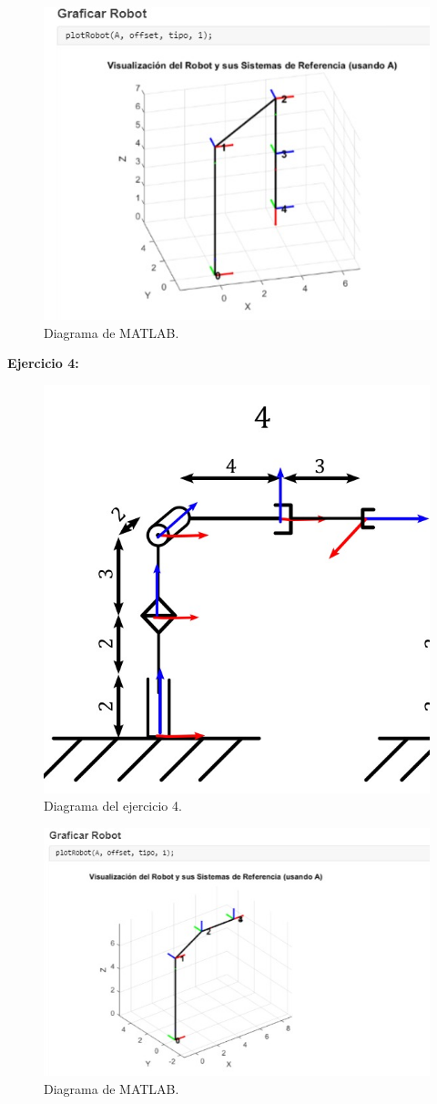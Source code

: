 \begin{figure}[htbp]
	\centering
	\includegraphics[width=0.5\linewidth]{img/EJ3}
	\caption{Diagrama de MATLAB.}
	\label{fig:ej3}
\end{figure}

\clearpage

\textbf{Ejercicio 4:}
\vspace{5mm}

\begin{figure}[htbp]
	\centering
	\includegraphics[width=0.5\linewidth]{img/4EJ}
	\caption{Diagrama del ejercicio 4.}
	\label{fig:4ej}
\end{figure}

\begin{figure}[htbp]
	\centering
	\includegraphics[width=0.5\linewidth]{img/EJ4}
	\caption{Diagrama de MATLAB.}
	\label{fig:ej4}
\end{figure}

